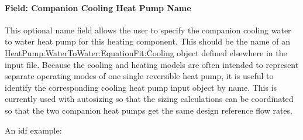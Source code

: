\paragraph{Field: Companion Cooling Heat Pump Name}\label{field-cooling-companion-name}

This optional name field allows the user to specify the companion cooling water to water heat pump for this heating component.  This should be the name of an \hyperref[heatpumpwatertowaterequationfitcooling]{HeatPump:WaterToWater:EquationFit:Cooling} object defined elsewhere in the input file.  Because the cooling and heating models are often intended to represent separate operating modes of one single reversible heat pump, it is useful to identify the corresponding cooling heat pump input object by name.  This is currently used with autosizing so that the sizing calculations can be coordinated  so that the two companion heat pumps get the same design reference flow rates.


An idf example:

